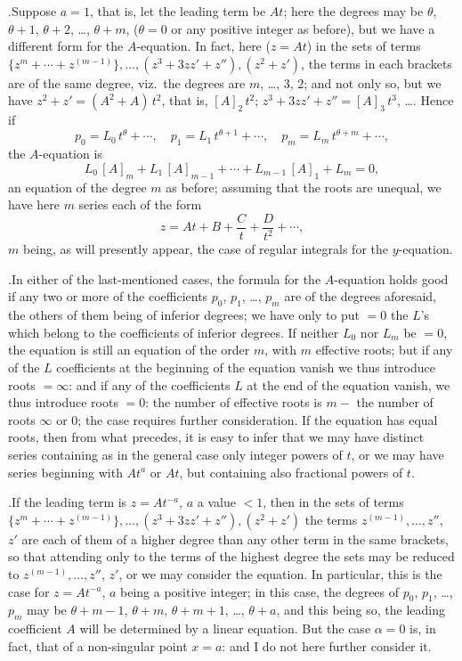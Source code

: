 \documentclass[11pt]{article}
\begin{document}
\medskip

.\quad Suppose $a = 1$, that is, let the leading term be $At$; here the degrees may be $\theta$, $\theta + 1$, $\theta + 2$, \ldots, $\theta + m$, ($\theta = 0$ or any positive integer as before), but we have a different form for the $A$-equation. In fact, here ($z = At$) in the sets of terms $\{z^{m} + \cdots + z^{(m-1)}\}, \ldots, (z^{3} + 3zz' + z''), (z^{2} + z')$, the terms in each brackets are of the same degree, viz.\ the degrees are $m$, \ldots, $3$, $2$; and not only so, but we have $z^{2} + z' = (A^{2} + A)\,t^{2}$, that is, $[A]_{2}\,t^{2}$; $z^{3} + 3zz' + z'' = [A]_{3}\,t^{3}$, \ldots. Hence if
\[
p_{0} = L_{0}\,t^{\theta} + \cdots,\quad p_{1} = L_{1}\,t^{\theta+1} + \cdots,\quad p_{m} = L_{m}\,t^{\theta+m} + \cdots,
\]
the $A$-equation is
\[
L_{0}\,[A]_{m} + L_{1}\,[A]_{m-1} + \cdots + L_{m-1}\,[A]_{1} + L_{m} = 0,
\]
an equation of the degree $m$ as before; assuming that the roots are unequal, we have here $m$ series each of the form
\[
z = At + B + \frac{C}{t} + \frac{D}{t^{2}} + \cdots,
\]
$m$ being, as will presently appear, the case of regular integrals for the $y$-equation.

\medskip

.\quad In either of the last-mentioned cases, the formula for the $A$-equation holds good if any two or more of the coefficients $p_{0}$, $p_{1}$, \ldots, $p_{m}$ are of the degrees aforesaid, the others of them being of inferior degrees; we have only to put $=0$ the $L$'s which belong to the coefficients of inferior degrees. If neither $L_{0}$ nor $L_{m}$ be $=0$, the equation is still an equation of the order $m$, with $m$ effective roots; but if any of the $L$ coefficients at the beginning of the equation vanish we thus introduce roots $=\infty$: and if any of the coefficients $L$ at the end of the equation vanish, we thus introduce roots $=0$: the number of effective roots is $m-$ the number of roots $\infty$ or $0$; the case requires further consideration. If the equation has equal roots, then from what precedes, it is easy to infer that we may have distinct series containing as in the general case only integer powers of $t$, or we may have series beginning with $At^{a}$ or $At$, but containing also fractional powers of $t$.

\medskip

.\quad If the leading term is $z = At^{-a}$, $a$ a value $< 1$, then in the sets of terms $\{z^{m} + \cdots + z^{(m-1)}\}, \ldots, (z^{3} + 3zz' + z''), (z^{2} + z')$ the terms $z^{(m-1)}, \ldots, z''$, $z'$ are each of them of a higher degree than any other term in the same brackets, so that attending only to the terms of the highest degree the sets may be reduced to $z^{(m-1)}, \ldots, z''$, $z'$, or we may consider the equation. In particular, this is the case for $z = At^{-a}$, $a$ being a positive integer; in this case, the degrees of $p_{0}$, $p_{1}$, \ldots, $p_{m}$ may be $\theta + m-1$, $\theta + m$, $\theta + m + 1$, \ldots, $\theta + a$, and this being so, the leading coefficient $A$ will be determined by a linear equation. But the case $\alpha = 0$ is, in fact, that of a non-singular point $x = a$: and I do not here further consider it.
\end{document}
